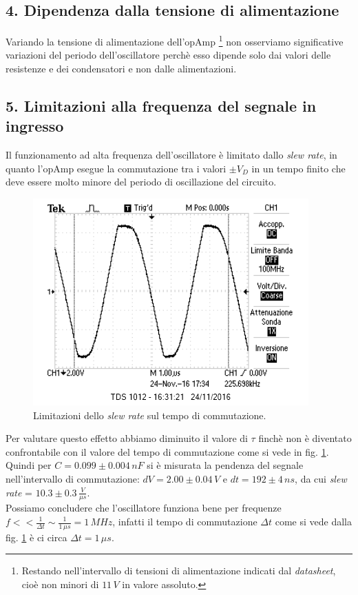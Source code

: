 \documentclass[10pt,a4paper]{article}
\begin{document}
\subsection*{4. Dipendenza dalla tensione di alimentazione}
Variando la tensione di alimentazione dell'opAmp \footnote{Restando nell'intervallo di tensioni di alimentazione indicati dal \emph{datasheet}, cioè non minori di $11\,V$ in valore assoluto.} non osserviamo significative variazioni del periodo dell'oscillatore perchè esso dipende solo dai valori delle resistenze e dei condensatori e non dalle alimentazioni. 


\subsection*{5. Limitazioni alla frequenza del segnale in ingresso}
Il funzionamento ad alta frequenza dell'oscillatore è limitato dallo \emph{slew rate}, in quanto l'opAmp esegue la commutazione tra i valori $\pm V_{D}$ in un tempo finito che deve essere molto minore del periodo di oscillazione del circuito.

\begin{figure}[htb!]
\centering
\includegraphics[scale=1.0]{immagini/multivibSlewRate.png}
\caption{Limitazioni dello \emph{slew rate} sul tempo di commutazione.}
\label{slewrate}
\end{figure}

Per valutare questo effetto abbiamo diminuito il valore di $\tau$ finchè non è diventato confrontabile con il valore del tempo di commutazione come si vede in fig. \ref{slewrate}. Quindi per $C = 0.099 \pm 0.004\, nF$ si è misurata la pendenza del segnale nell'intervallo di commutazione: $dV = 2.00 \pm 0.04 \, V$ e $dt = 192 \pm 4 \, ns$, da cui \emph{slew rate} = $10.3 \pm 0.3 \, \frac{V}{\mu s}$.\\
Possiamo concludere che l'oscillatore funziona bene per frequenze $f << \frac{1}{\Delta t} \sim \frac{1}{1 \, \mu s} = 1 \, MHz$, infatti il tempo di commutazione $\Delta t$ come si vede dalla fig. \ref{slewrate} è ci circa $\Delta t = 1 \, \mu s$.
\end{document}
